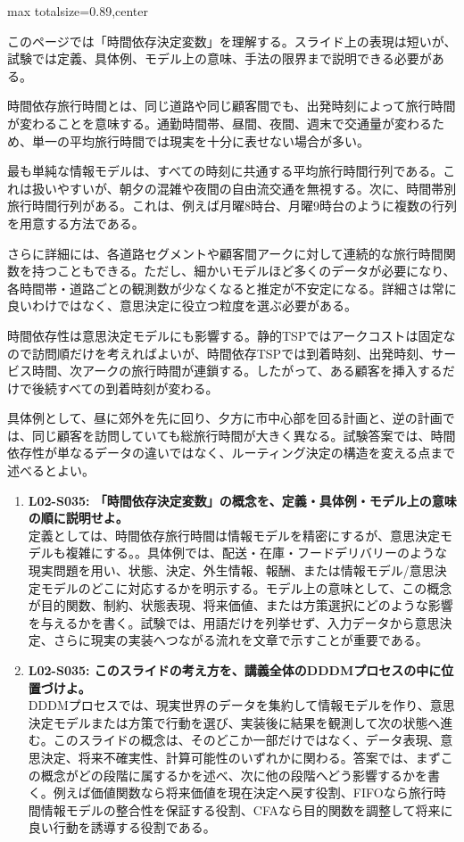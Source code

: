 \begin{minipage}[t]{0.58\textwidth}
\begin{adjustbox}{max totalsize={\textwidth}{0.89\textheight},center}
\begin{minipage}{\textwidth}\scriptsize
{}このページでは「時間依存決定変数」を理解する。スライド上の表現は短いが、試験では定義、具体例、モデル上の意味、手法の限界まで説明できる必要がある。\par
時間依存旅行時間とは、同じ道路や同じ顧客間でも、出発時刻によって旅行時間が変わることを意味する。通勤時間帯、昼間、夜間、週末で交通量が変わるため、単一の平均旅行時間では現実を十分に表せない場合が多い。\par
最も単純な情報モデルは、すべての時刻に共通する平均旅行時間行列である。これは扱いやすいが、朝夕の混雑や夜間の自由流交通を無視する。次に、時間帯別旅行時間行列がある。これは、例えば月曜8時台、月曜9時台のように複数の行列を用意する方法である。\par
さらに詳細には、各道路セグメントや顧客間アークに対して連続的な旅行時間関数を持つこともできる。ただし、細かいモデルほど多くのデータが必要になり、各時間帯・道路ごとの観測数が少なくなると推定が不安定になる。詳細さは常に良いわけではなく、意思決定に役立つ粒度を選ぶ必要がある。\par
時間依存性は意思決定モデルにも影響する。静的TSPではアークコストは固定なので訪問順だけを考えればよいが、時間依存TSPでは到着時刻、出発時刻、サービス時間、次アークの旅行時間が連鎖する。したがって、ある顧客を挿入するだけで後続すべての到着時刻が変わる。\par
具体例として、昼に郊外を先に回り、夕方に市中心部を回る計画と、逆の計画では、同じ顧客を訪問していても総旅行時間が大きく異なる。試験答案では、時間依存性が単なるデータの違いではなく、ルーティング決定の構造を変える点まで述べるとよい。\par{}\begin{enumerate}\item \textbf{L02-S035: 「時間依存決定変数」の概念を、定義・具体例・モデル上の意味の順に説明せよ。}\\定義としては、時間依存旅行時間は情報モデルを精密にするが、意思決定モデルも複雑にする。。具体例では、配送・在庫・フードデリバリーのような現実問題を用い、状態、決定、外生情報、報酬、または情報モデル/意思決定モデルのどこに対応するかを明示する。モデル上の意味として、この概念が目的関数、制約、状態表現、将来価値、または方策選択にどのような影響を与えるかを書く。試験では、用語だけを列挙せず、入力データから意思決定、さらに現実の実装へつながる流れを文章で示すことが重要である。\item \textbf{L02-S035: このスライドの考え方を、講義全体のDDDMプロセスの中に位置づけよ。}\\DDDMプロセスでは、現実世界のデータを集約して情報モデルを作り、意思決定モデルまたは方策で行動を選び、実装後に結果を観測して次の状態へ進む。このスライドの概念は、そのどこか一部だけではなく、データ表現、意思決定、将来不確実性、計算可能性のいずれかに関わる。答案では、まずこの概念がどの段階に属するかを述べ、次に他の段階へどう影響するかを書く。例えば価値関数なら将来価値を現在決定へ戻す役割、FIFOなら旅行時間情報モデルの整合性を保証する役割、CFAなら目的関数を調整して将来に良い行動を誘導する役割である。\end{enumerate}

\end{minipage}
\end{adjustbox}
\end{minipage}
